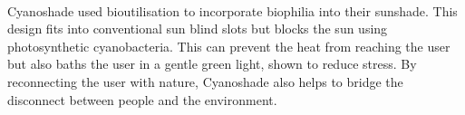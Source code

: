 \documentclass{report}
\begin{document}
\clearpage
\begin{figure}
    \centering
\end{figure}
\clearpage

 \\

Cyanoshade used bioutilisation to incorporate biophilia into their sunshade. This design fits into conventional sun blind slots but blocks the sun using photosynthetic cyanobacteria. This can prevent the heat from reaching the user but also baths the user in a gentle green light, shown to reduce stress. By reconnecting the user with nature, Cyanoshade also helps to bridge the disconnect between people and the environment. 

\clearpage
\begin{figure}
    \centering
\end{figure}
\clearpage
\end{document}

